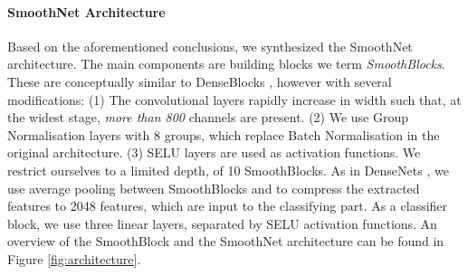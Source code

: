 \documentclass[nohyperref]{article}
\theoremstyle{plain}
\theoremstyle{definition}
\theoremstyle{remark}
\begin{document}
\paragraph{SmoothNet Architecture}
Based on the aforementioned conclusions, we synthesized the SmoothNet architecture. The main components are building blocks we term \textit{SmoothBlocks}. These are conceptually similar to DenseBlocks \cite{huang2017densely}, however with several modifications: (1) The  convolutional layers rapidly increase in width such that, at the widest stage, \textit{more than 800} channels are present. (2) We use Group Normalisation layers with 8 groups, which replace Batch Normalisation in the original architecture. (3) SELU layers \cite{klambauer2017self} are used as activation functions. We restrict ourselves to a limited depth, of 10 SmoothBlocks. As in DenseNets \cite{huang2017densely}, we use average pooling between SmoothBlocks and to compress the extracted features to 2048 features, which are input to the classifying part. As a classifier block, we use three linear layers, separated by SELU activation functions. An overview of the SmoothBlock and the SmoothNet architecture can be found in Figure \ref{fig:architecture}. 
\end{document}
